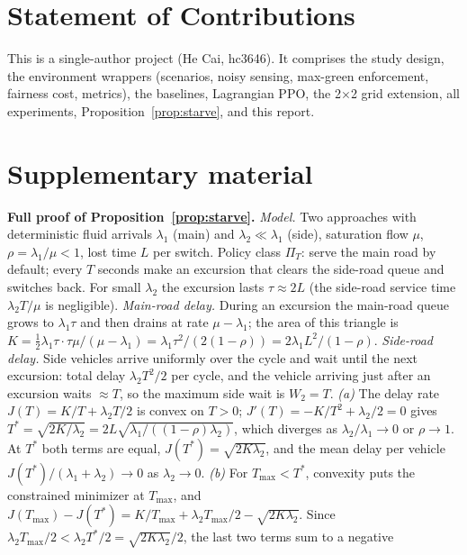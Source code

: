 \documentclass{article}
\begin{document}



\section*{Statement of Contributions}
This is a single-author project (He Cai, hc3646). It comprises the study design, the
environment wrappers (scenarios, noisy sensing, max-green enforcement, fairness cost,
metrics), the baselines, Lagrangian PPO, the 2$\times$2 grid extension, all experiments,
Proposition~\ref{prop:starve}, and this report.

\newpage
\appendix
\onecolumn
\section{Supplementary material}
\textbf{Full proof of Proposition~\ref{prop:starve}.}
\emph{Model.} Two approaches with deterministic fluid arrivals $\lambda_1$ (main) and
$\lambda_2\ll\lambda_1$ (side), saturation flow $\mu$, $\rho=\lambda_1/\mu<1$, lost time $L$
per switch. Policy class $\Pi_T$: serve the main road by default; every $T$ seconds make an
excursion that clears the side-road queue and switches back. For small $\lambda_2$ the
excursion lasts $\tau\approx2L$ (the side-road service time $\lambda_2T/\mu$ is negligible).
\emph{Main-road delay.} During an excursion the main-road queue grows to $\lambda_1\tau$ and
then drains at rate $\mu-\lambda_1$; the area of this triangle is
$K=\tfrac12\lambda_1\tau\cdot\tau\mu/(\mu-\lambda_1)=\lambda_1\tau^2/(2(1-\rho))=2\lambda_1L^2/(1-\rho)$.
\emph{Side-road delay.} Side vehicles arrive uniformly over the cycle and wait until the next
excursion: total delay $\lambda_2T^2/2$ per cycle, and the vehicle arriving just after an
excursion waits $\approx T$, so the maximum side wait is $W_2=T$.
\emph{(a)} The delay rate $J(T)=K/T+\lambda_2T/2$ is convex on $T>0$; $J'(T)=-K/T^2+\lambda_2/2=0$
gives $T^*=\sqrt{2K/\lambda_2}=2L\sqrt{\lambda_1/((1-\rho)\lambda_2)}$, which diverges as
$\lambda_2/\lambda_1\to0$ or $\rho\to1$. At $T^*$ both terms are equal, $J(T^*)=\sqrt{2K\lambda_2}$,
and the mean delay per vehicle $J(T^*)/(\lambda_1+\lambda_2)\to0$ as $\lambda_2\to0$.
\emph{(b)} For $T_{\max}<T^*$, convexity puts the constrained minimizer at $T_{\max}$, and
$J(T_{\max})-J(T^*)=K/T_{\max}+\lambda_2T_{\max}/2-\sqrt{2K\lambda_2}$. Since
$\lambda_2T_{\max}/2<\lambda_2T^*/2=\sqrt{2K\lambda_2}/2$, the last two terms sum to a negative
\end{document}
